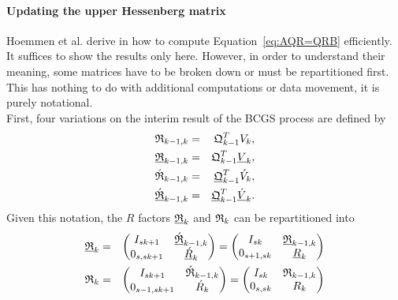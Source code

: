 \documentclass{scrartcl}
\numberwithin{equation}{section}
\begin{document}
\paragraph{Updating the upper Hessenberg matrix}
Hoemmen et al. derive in \cite{Hoemmen:2010:CKS:1970638} how to compute Equation~\eqref{eq:AQR=QRB} efficiently. It suffices to show the results only here.
However, in order to understand their meaning, some matrices have to be broken down or must be repartitioned first. This has nothing to do with additional computations or data movement, it is purely notational.\\

First, four variations on the interim result of the BCGS process are defined by
\begin{eqnarray*}
	\frak{R}_{k - 1, k} &=& \frak{Q}_{k - 1}^TV_k,\\
	\underline{\frak{R}}_{k - 1, k} &=& \frak{Q}_{k - 1}^T\underline{V}_k,\\
	\frak{\acute{R}}_{k - 1, k} &=& \underline{\frak{Q}}_{k - 1}^T\acute{V}_k,\\
	\underline{\frak{\acute{R}}}_{k - 1, k} &=& \underline{\frak{Q}}_{k - 1}^T\underline{\acute{V}}_k.
\end{eqnarray*}
Given this notation, the $R$ factors $\underline{\frak{R}}_k$ and $\frak{R}_k$ can be repartitioned into
\begin{eqnarray*}
\underline{\frak{R}}_k &=&
\begin{pmatrix}
	I_{sk + 1} & \underline{\acute{\frak{R}}}_{k - 1, k} \\
	0_{s, sk + 1} & \underline{\acute{R}}_k \\
\end{pmatrix} = 
\begin{pmatrix}
	I_{sk} & \underline{\frak{R}}_{k - 1, k} \\
	0_{s + 1, sk} & \underline{R}_k \\
\end{pmatrix} \\
\frak{R}_k &=&
\begin{pmatrix}
	I_{sk + 1} & \acute{\frak{R}}_{k - 1, k} \\
	0_{s - 1, sk + 1} & \acute{R}_k \\
\end{pmatrix} = 
\begin{pmatrix}
	I_{sk} & \frak{R}_{k - 1, k} \\
	0_{s, sk} & R_k \\
\end{pmatrix}
\end{eqnarray*}
\end{document}
